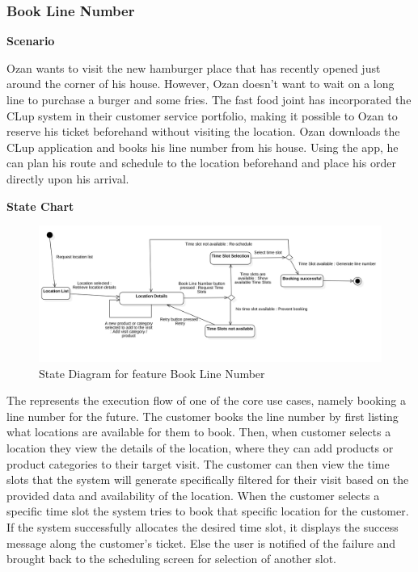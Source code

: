 \subsubsection{Book Line Number}

\textbf{Scenario}

Ozan wants to visit the new hamburger place that has recently opened just around the corner of his house.
However, Ozan doesn't want to wait on a long line to purchase a burger and some fries.
The fast food joint has incorporated the CLup system in their customer service portfolio, making it possible to Ozan to reserve his ticket beforehand without visiting the location.
Ozan downloads the CLup application and books his line number from his house.
Using the app, he can plan his route and schedule to the location beforehand and place his order directly upon his arrival.

\textbf{State Chart}

\begin{figure}[H]
    \centering
    \includegraphics[height=0.4\textwidth]{Images/StateCharts/BookLineNumber.png}
    \caption{State Diagram for feature Book Line Number}
    \label{fig:SDBookLine}
\end{figure}

The  represents the execution flow of one of the core use cases, namely booking a line number for the future.
The customer books the line number by first listing what locations are available for them to book.
Then, when customer selects a location they view the details of the location, where they can add products or product categories to their target visit.
The customer can then view the time slots that the system will generate specifically filtered for their visit based on the provided data and availability of the location.
When the customer selects a specific time slot the system tries to book that specific location for the customer.
If the system successfully allocates the desired time slot, it displays the success message along the customer's ticket.
Else the user is notified of the failure and brought back to the scheduling screen for selection of another slot.


